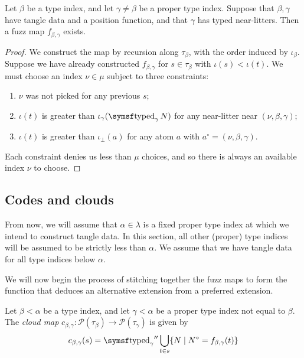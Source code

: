 \begin{proposition}
    Let \( \beta \) be a type index, and let \( \gamma \neq \beta \) be a proper type index.
    Suppose that \( \beta, \gamma \) have tangle data and a position function, and that \( \gamma \) has typed near-litters.
    Then a fuzz map \( f_{\beta,\gamma} \) exists.
\end{proposition}
\begin{proof}
    We construct the map by recursion along \( \tau_\beta \), with the order induced by \( \iota_\beta \).
    Suppose we have already constructed \( f_{\beta,\gamma} \) for \( s \in \tau_\beta \) with \( \iota(s) < \iota(t) \).
    We must choose an index \( \nu \in \mu \) subject to three constraints:
    \begin{enumerate}
        \item \( \nu \) was not picked for any previous \( s \);
        \item \( \iota(t) \) is greater than \( \iota_\gamma(\typed_\gamma N) \) for any near-litter near \( (\nu, \beta, \gamma) \);
        \item \( \iota(t) \) is greater than \( \iota_\bot(a) \) for any atom \( a \) with \( a^\circ = (\nu, \beta, \gamma) \).
    \end{enumerate}
    Each constraint denies us less than \( \mu \) choices, and so there is always an available index \( \nu \) to choose.
\end{proof}

\subsection{Codes and clouds}

From now, we will assume that \( \alpha \in \lambda \) is a fixed proper type index at which we intend to construct tangle data.
In this section, all other (proper) type indices will be assumed to be strictly less than \( \alpha \).
We assume that we have tangle data for all type indices below \( \alpha \).

We will now begin the process of stitching together the fuzz maps to form the function that deduces an alternative extension from a preferred extension.

\begin{definition}
    Let \( \beta < \alpha \) be a type index, and let \( \gamma < \alpha \) be a proper type index not equal to \( \beta \).
    The \emph{cloud map} \( c_{\beta,\gamma} : \mathcal P(\tau_\beta) \to \mathcal P(\tau_\gamma) \) is given by
    \[ c_{\beta,\gamma}(s) = {\typed_\gamma} '' \bigcup_{t \in s} \{ N \mid N^\circ = f_{\beta,\gamma}(t) \} \]
\end{definition}

